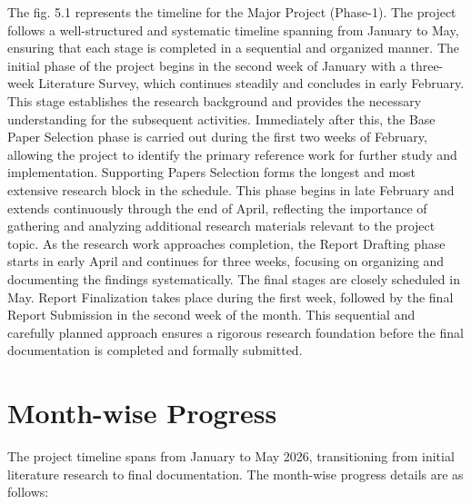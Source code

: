 The fig. 5.1 represents the timeline for the Major Project (Phase-1). The project follows a well-structured and systematic timeline spanning from January to May, ensuring that each stage is completed in a sequential and organized manner. The initial phase of the project begins in the second week of January with a three-week Literature Survey, which continues steadily and concludes in early February. This stage establishes the research background and provides the necessary understanding for the subsequent activities. Immediately after this, the Base Paper Selection phase is carried out during the first two weeks of February, allowing the project to identify the primary reference work for further study and implementation. Supporting Papers Selection forms the longest and most extensive research block in the schedule. This phase begins in late February and extends continuously through the end of April, reflecting the importance of gathering and analyzing additional research materials relevant to the project topic. As the research work approaches completion, the Report Drafting phase starts in early April and continues for three weeks, focusing on organizing and documenting the findings systematically. The final stages are closely scheduled in May. Report Finalization takes place during the first week, followed by the final Report Submission in the second week of the month. This sequential and carefully planned approach ensures a rigorous research foundation before the final documentation is completed and formally submitted.

\section{Month-wise Progress}
The project timeline spans from January to May 2026, transitioning from initial literature research to final documentation. The month-wise progress details are as follows:

